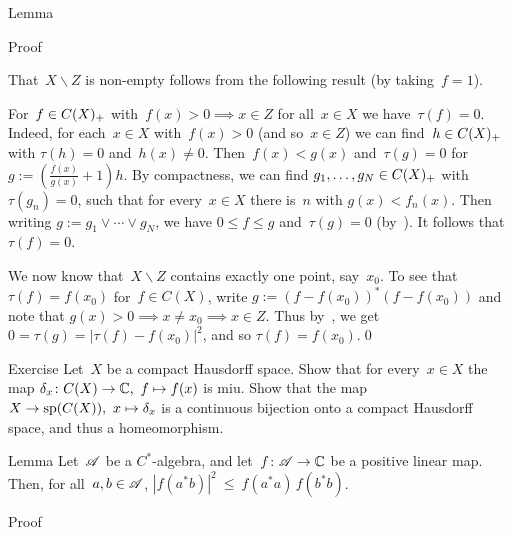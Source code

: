 \documentclass[main]{subfiles}
\begin{document}
\begin{parsec}
\begin{point}{Lemma}
\begin{point}{Proof}
\begin{point}
That~$X\backslash Z$ is non-empty
follows from the following result (by taking~$f=1$).
\end{point}
\begin{point}%
For~$f\in C(X)_{+}$
with~$f(x)> 0 \implies x\in Z$ for all~$x\in X$
we have~$\tau(f)=0$.
Indeed, for each~$x\in X$ with~$f(x)>0$
(and so~$x\in Z$)
we can find~$h\in C(X)_{+}$
with $\tau(h)=0$ and~$h(x)\neq 0$.
Then~$f(x)< g(x)$
and~$\tau(g)=0$
for $g:=(\frac{f(x)}{g(x)}+1)h$.
By compactness,
we can find $g_1,\dotsc,g_N\in C(X)_{+}$
with~$\tau(g_n)=0$,
such that for every~$x\in X$
there is~$n$ with $g(x)<f_n(x)$.
Then writing $g:=g_1\vee \dotsb \vee g_N$,
we have $0\leq f\leq g$ and~$\tau(g)=0$
(by~).
It follows that~$\tau(f)=0$.
\end{point}
\begin{point}%
We now know that~$X\backslash Z$ contains exactly
one point, say~$x_0$.
To see that~$\tau(f)=f(x_0)$
for~$f\in C(X)$,
write $g:=(f-f(x_0))^*(f-f(x_0))$
and note that $g(x)>0\implies x\neq x_0\implies  x\in Z$.
Thus by~,
we get $0=\tau(g)=\left|\tau(f)-f(x_0)\right|^2$,
and so $\tau(f)=f(x_0)$.\qed
\end{point}
\end{point}
\begin{point}{Exercise}%
Let~$X$ be a compact Hausdorff space.
Show that for every~$x\in X$
the map $\delta_x\colon C(X)\to \mathbb{C},\ f\mapsto f(x)$
is miu.
Show that the map $X\to \mathrm{sp}(C(X)),\ x\mapsto \delta_x$
is a continuous bijection
onto a compact Hausdorff space,
and thus a homeomorphism.
\end{point}
\end{point}
\end{parsec}


%
%
\begin{parsec}[cstar-cs]%
\begin{point}{Lemma}%
Let~$\mathscr{A}$ be a $C^*$-algebra,
and let~$f\colon \mathscr{A}\to \mathbb{C}$ be a positive linear map.\\
Then, for all~$a,b\in\mathscr{A}$,\quad
$\left|f(a^*b)\right|^2 \ \leq\ f(a^*a)\,f(b^*b)$.
\end{point}
\begin{point}{Proof}%
\end{point}
\end{parsec}
\end{document}
